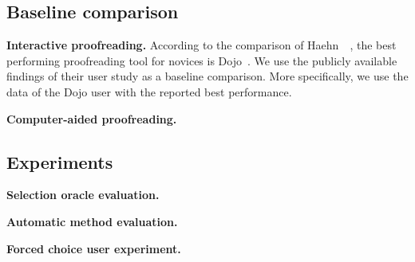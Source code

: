 \subsection{Baseline comparison}

\textbf{Interactive proofreading.} According to the comparison of Haehn~\etal~, the best performing proofreading tool for novices is Dojo~\cite{haehn_dojo_2014}. We use the publicly available findings of their user study as a baseline comparison. More specifically, we use the data of the Dojo user with the reported best performance.

\textbf{Computer-aided proofreading.} 

\subsection{Experiments}

\textbf{Selection oracle evaluation.}

\textbf{Automatic method evaluation.}

\textbf{Forced choice user experiment.}









